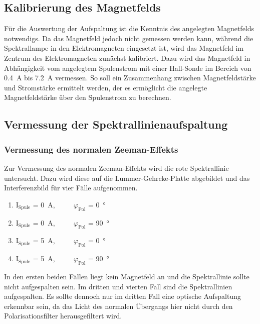         \FloatBarrier

    

    \subsection{Kalibrierung des Magnetfelds}
        Für die Auswertung der Aufspaltung ist die Kenntnis des angelegten Magnetfelds notwendigs. Da das Magnetfeld jedoch nicht gemessen werden kann, während die Spektrallampe in den Elektromagneten 
        eingesetzt ist, wird das Magnetfeld im Zentrum des Elektromagneten zunächst kalibriert. Dazu wird das Magnetfeld in Abhängigkeit vom angelegtem Spulenstrom mit einer Hall-Sonde im Bereich von 
        \SI{0.4}{\ampere} bis \SI{7.2}{\ampere} vermessen. So soll ein Zusammenhang zwischen Magnetfeldstärke und Stromstärke ermittelt werden, der es ermöglicht die angelegte Magnetfeldstärke über den 
        Spulenstrom zu berechnen.   

    \subsection{Vermessung der Spektrallinienaufspaltung}
        \subsubsection*{Vermessung des normalen Zeeman-Effekts}
            Zur Vermessung des normalen Zeeman-Effekts wird die rote Spektrallinie untersucht. Dazu wird diese auf die Lummer-Gehrcke-Platte abgebildet und das Interferenzbild für vier Fälle aufgenommen.
            
            \begin{enumerate}
                \item I$_{\text{Spule}}$ = \SI{0}{\ampere}, $\qquad$    $\varphi_{\text{Pol}}$ = \SI{0}{\degree}
                \item I$_{\text{Spule}}$ = \SI{0}{\ampere}, $\qquad$    $\varphi_{\text{Pol}}$ = \SI{90}{\degree}
                \item I$_{\text{Spule}}$ = \SI{5}{\ampere}, $\qquad$    $\varphi_{\text{Pol}}$ = \SI{0}{\degree}
                \item I$_{\text{Spule}}$ = \SI{5}{\ampere}, $\qquad$    $\varphi_{\text{Pol}}$ = \SI{90}{\degree}
            \end{enumerate}

            In den ersten beiden Fällen liegt kein Magnetfeld an und die Spektrallinie sollte nicht aufgespalten sein. Im dritten und vierten Fall sind die Spektrallinien aufgespalten. Es sollte dennoch nur 
            im dritten Fall eine optische Aufspaltung erkennbar sein, da das Licht des normalen Übergangs hier nicht durch den Polarisationsfilter herausgefiltert wird.
            
